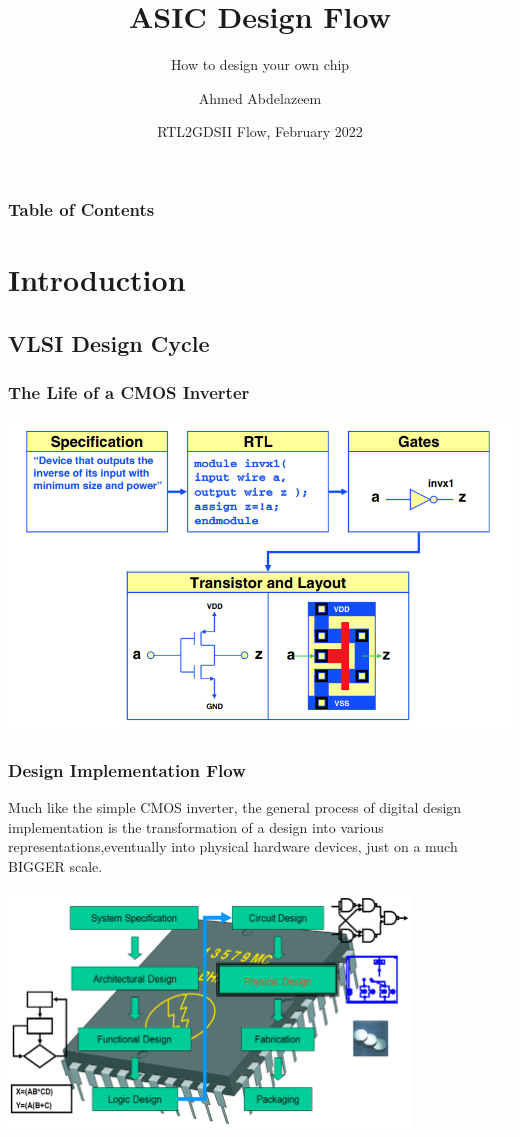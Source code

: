 \documentclass[compress]{beamer}
\title[Introduction to ASIC Design] %
{ASIC Design Flow}
\subtitle{How to design your own chip}
\author[Ahmed Abdelazeem] %
{Ahmed Abdelazeem}
\institute[ZU] %
{
	Faculty of Engineering\\
	Zagazig University
}
\date[ZU 2023] %
{RTL2GDSII Flow, February 2022}
\begin{document}
	
	\frame{\titlepage}
	
	
	\begin{frame}
		\frametitle{Table of Contents}
		\tableofcontents
	\end{frame}
\section[Intro]{Introduction}
\subsection[Design]{VLSI Design Cycle}
\begin{frame}
	\frametitle{The Life of a CMOS Inverter}
	\begin{center}
		\includegraphics[width=\textwidth]{CMOS_CYCLE}
	\end{center}
\end{frame}	


\begin{frame}
	\frametitle{Design Implementation Flow}
	Much like the simple CMOS inverter, the general process of digital design implementation is the transformation of a design into various representations,eventually into physical hardware devices, just on a much BIGGER scale.
	\begin{center}
		\includegraphics[width=0.8\textwidth]{design}
	\end{center}
	
\end{frame} 
\end{document}
